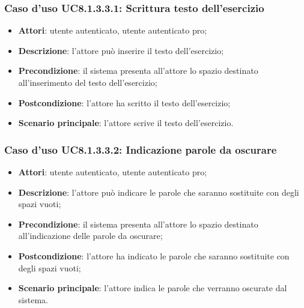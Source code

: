 \subsubsection{Caso d'uso UC8.1.3.3.1: Scrittura testo dell'esercizio}
	\begin{itemize}
		\item
			\textbf{Attori}: utente autenticato, utente autenticato pro;
		\item		
			\textbf{Descrizione}: l'attore può inserire il testo dell'esercizio;
		\item
			\textbf{Precondizione}: il sistema presenta all'attore lo spazio destinato all'inserimento del testo dell'esercizio; 
		\item
			\textbf{Postcondizione}: l'attore ha scritto il testo dell'esercizio;
		\item
			\textbf{Scenario principale}: l'attore scrive il testo dell'esercizio.
	\end{itemize}


\subsubsection{Caso d'uso UC8.1.3.3.2: Indicazione parole da oscurare}
	\begin{itemize}
		\item
			\textbf{Attori}: utente autenticato, utente autenticato pro;
		\item		
			\textbf{Descrizione}: l'attore può indicare le parole che saranno sostituite con degli spazi vuoti;
		\item
			\textbf{Precondizione}: il sistema presenta all'attore lo spazio destinato all'indicazione delle parole da oscurare;  
		\item
			\textbf{Postcondizione}: l'attore ha indicato le parole che saranno sostituite con degli spazi vuoti;
		\item
			\textbf{Scenario principale}: l'attore indica le parole che verranno oscurate dal sistema.
	\end{itemize}